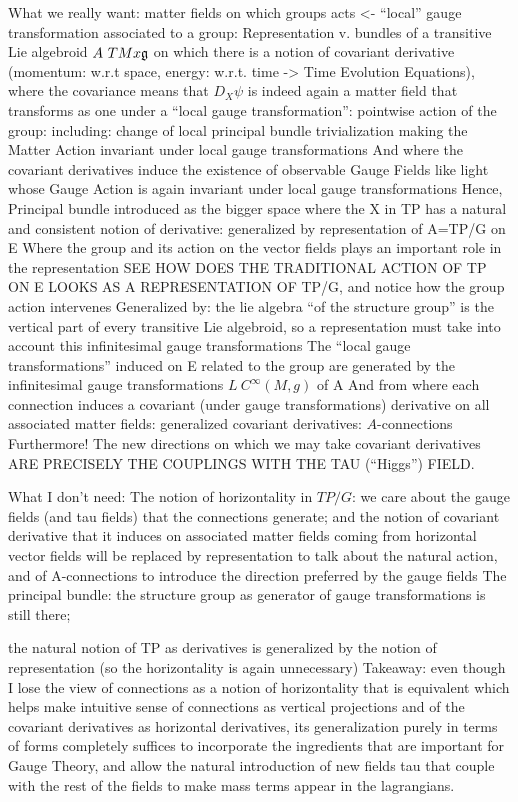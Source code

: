 { \color{gray}
What we really want: 
matter fields 
on which groups acts <- “local” gauge transformation associated to a group: Representation v. bundles of a transitive Lie algebroid $A ~ TM x \mathfrak{g}$
on which there is a notion of covariant derivative (momentum: w.r.t space, energy: w.r.t. time -> Time Evolution Equations), 
where the covariance means that $D_X\psi$ is indeed again a matter field 
that  transforms as one under a “local gauge transformation”:
pointwise action of the group: 
including: change of local principal bundle trivialization
making the Matter Action invariant under local gauge transformations
And where the covariant derivatives induce the existence of observable Gauge Fields like light
whose Gauge Action is again invariant under local gauge transformations
Hence,
Principal bundle introduced as the bigger space where the X in TP has a natural and consistent notion of derivative: generalized by representation of A=TP/G on E
Where the group and its action on the vector fields plays an important role in the representation
SEE HOW DOES THE TRADITIONAL ACTION OF TP ON E LOOKS AS A REPRESENTATION OF TP/G, and notice how the group action intervenes
Generalized by: the lie algebra “of the structure group” is the vertical part of every transitive Lie algebroid, so a representation must take into account this infinitesimal gauge transformations
The “local gauge transformations” induced on E related to the group are generated by the infinitesimal gauge transformations $L~C^\infty(M, g)$ of A
And from where each connection induces a covariant (under gauge transformations) derivative on all associated matter fields: generalized covariant derivatives: $A$-connections
Furthermore! The new directions on which we may take covariant derivatives ARE PRECISELY THE COUPLINGS WITH THE TAU (“Higgs”) FIELD.

What I don’t need:
The notion of horizontality in $TP/G$: we care about 
the gauge fields (and tau fields) that the connections generate; and
the notion of covariant derivative that it induces on associated matter fields coming from horizontal vector fields will be replaced by 
representation to talk about the natural action, and of 
A-connections to introduce the direction preferred by the gauge fields
The principal bundle: 
the structure group as generator of gauge transformations is still there; 

the natural notion of TP as derivatives is generalized by the notion of representation (so the horizontality is again unnecessary)
Takeaway: even though I lose the view of connections as a notion of horizontality that is equivalent which helps make intuitive sense of connections as vertical projections and of the covariant derivatives as horizontal derivatives, its generalization purely in terms of forms completely suffices to incorporate the ingredients that are important for Gauge Theory, and allow the natural introduction of new fields tau that couple with the rest of the fields to make mass terms appear in the lagrangians.


}
